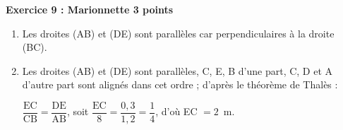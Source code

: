 \textbf{Exercice 9 : Marionnette \hfill 3 points}

\medskip

%
%
%

\begin{enumerate}
\item %
Les droites (AB) et (DE) sont parallèles car perpendiculaires à la droite (BC).
\item %
Les droites  (AB) et (DE) sont parallèles, C, E, B d’une part, C, D et A d’autre part sont alignés dans cet ordre ; d’après le théorème de Thalès :

$\dfrac{\text{EC}}{\text{CB}} = \dfrac{\text{DE}}{\text{AB}}$, soit $\dfrac{\text{EC}}{8} = \dfrac{0,3}{1,2} = \dfrac{1}{4}$, d’où EC $ = 2$~m. 
\end{enumerate}

